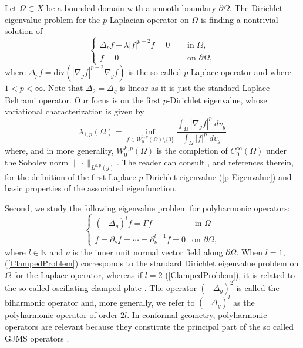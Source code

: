 \documentclass{amsart}
\begin{document}
Let $\Omega\subset X$ be a bounded domain with a smooth boundary $\partial \Omega$. The Dirichlet eigenvalue problem for the $p$-Laplacian operator on $\Omega$ is finding a nontrivial solution of
\begin{equation}\label{p-Equation}
    \begin{cases}
        \Delta_p f + \lambda |f|^{p-2}f = 0 & \quad\text{ in }\Omega,\\
        f = 0 & \quad\text{ on }\partial\Omega,
    \end{cases}
\end{equation}
where $\Delta_p f = \text{div}(|\nabla_{g}f|^{p-2}\nabla_{g}f)$ is the so-called $p$-Laplace operator and where $1<p<\infty$. Note that $\Delta_2=\Delta_{g}$ is linear as it is just the standard Laplace-Beltrami operator. Our focus is on the first $p$-Dirichlet eigenvalue, whose variational characterization is given by
\begin{equation}\label{p-Eigenvalue}
    \lambda_{1,p}(\Omega) = \inf_{f\in W^{1,p}_0(\Omega)\setminus\{0\}} \frac{\displaystyle\int_\Omega |\nabla_{g}f|^p\;dv_{g}}{\displaystyle\int_\Omega |f|^p\;dv_{g}}
\end{equation}
where, and in more generality, $W^{k,p}_0(\Omega)$ is the completion of $C^\infty_0(\Omega)$ under the Sobolev norm $\|\cdot\|_{L^{k,p}(g)}$. The reader can consult \cites{LEAn2006Epft,LindqvistPeter}, and references therein, for the definition of the first Laplace $p$-Dirichlet eigenvalue (\ref{p-Eigenvalue}) and basic properties of the associated eigenfunction. 

Second, we study the following eigenvalue problem for polyharmonic operators: 
\begin{equation}\label{ClampedProblem}
\begin{cases}
    (-\Delta_{g})^lf = \Gamma f & \text{ in }\Omega \\ f = \partial_\nu f =\cdots = \partial^{l-1}_\nu f =0 &\text{on }\partial \Omega,
\end{cases}
\end{equation}
where $l\in\mathbb{N}$ and $\nu$ is the inner unit normal vector field along $\partial \Omega$. When $l = 1$, (\ref{ClampedProblem}) corresponds to the standard Dirichlet eigenvalue problem on $\Omega$ for the Laplace operator, whereas if $l=2$ (\ref{ClampedProblem}), it is related to the so called oscillating clamped plate \cite{JostJurgen2011Ubfe}. The operator $(-\Delta_{g})^2$ is called the biharmonic operator and, more generally, we refer to $(-\Delta_{g})^l$ as the polyharmonic operator of order $2l$. In conformal geometry, polyharmonic operators are relevant because they constitute the principal part of the so called GJMS operators \cite{GJMS}.
\end{document}
